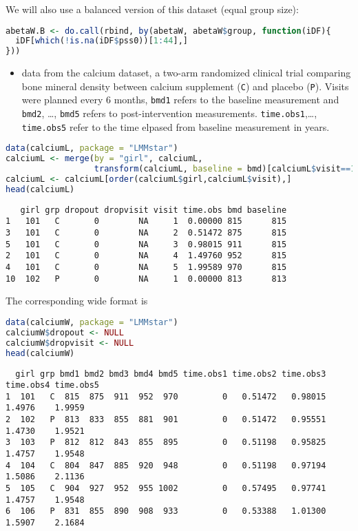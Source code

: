 \documentclass[12pt]{article}
\begin{document}
We will also use a balanced version of this dataset (equal group size):
\begin{lstlisting}[language=r,numbers=none]
abetaW.B <- do.call(rbind, by(abetaW, abetaW$group, function(iDF){
  iDF[which(!is.na(iDF$pss0))[1:44],]
}))
\end{lstlisting}

\clearpage

\begin{itemize}
\item data from the calcium dataset, a two-arm randomized clinical trial
comparing bone mineral density between calcium supplement (\texttt{C}) and
placebo (\texttt{P}). Visits were planned every 6 months, \texttt{bmd1} refers to
the baseline measurement and \texttt{bmd2}, \ldots, \texttt{bmd5} refers to
post-intervention measurements. \texttt{time.obs1},\ldots, \texttt{time.obs5}
refer to the time elpased from baseline measurement in years.
\end{itemize}

\begin{lstlisting}[language=r,numbers=none]
data(calciumL, package = "LMMstar")
calciumL <- merge(by = "girl", calciumL,
                  transform(calciumL, baseline = bmd)[calciumL$visit==1,c("girl","baseline")])
calciumL <- calciumL[order(calciumL$girl,calciumL$visit),]
head(calciumL)
\end{lstlisting}

\label{}
\begin{verbatim}
   girl grp dropout dropvisit visit time.obs bmd baseline
1   101   C       0        NA     1  0.00000 815      815
3   101   C       0        NA     2  0.51472 875      815
5   101   C       0        NA     3  0.98015 911      815
2   101   C       0        NA     4  1.49760 952      815
4   101   C       0        NA     5  1.99589 970      815
10  102   P       0        NA     1  0.00000 813      813
\end{verbatim}



The corresponding wide format is
\begin{lstlisting}[language=r,numbers=none]
data(calciumW, package = "LMMstar")
calciumW$dropout <- NULL
calciumW$dropvisit <- NULL
head(calciumW)
\end{lstlisting}

\label{}
\begin{verbatim}
  girl grp bmd1 bmd2 bmd3 bmd4 bmd5 time.obs1 time.obs2 time.obs3 time.obs4 time.obs5
1  101   C  815  875  911  952  970         0   0.51472   0.98015    1.4976    1.9959
2  102   P  813  833  855  881  901         0   0.51472   0.95551    1.4730    1.9521
3  103   P  812  812  843  855  895         0   0.51198   0.95825    1.4757    1.9548
4  104   C  804  847  885  920  948         0   0.51198   0.97194    1.5086    2.1136
5  105   C  904  927  952  955 1002         0   0.57495   0.97741    1.4757    1.9548
6  106   P  831  855  890  908  933         0   0.53388   1.01300    1.5907    2.1684
\end{verbatim}
\end{document}
